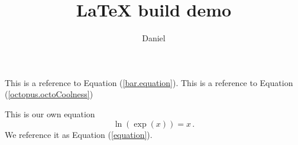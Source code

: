 \documentclass[twocolumn]{article}
\author{Daniel}
\title{LaTeX build demo}
\begin{document}
\maketitle

This is a reference to Equation (\ref{bar.equation}).
This is a reference to Equation (\ref{octopus.octoCoolness})


This is our own equation
\begin{equation}
  \ln(\exp(x)) = x \, . \label{equation} %
\end{equation}
We reference it as Equation (\ref{equation}).
\end{document}
